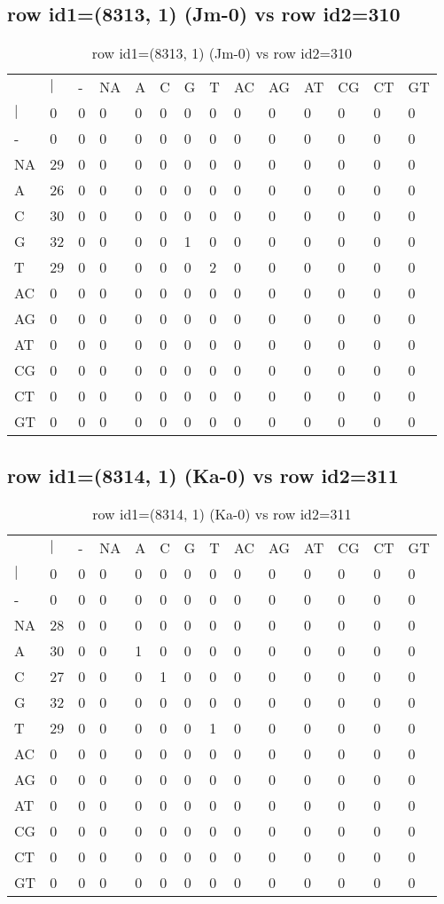 \subsection{row id1=(8313, 1) (Jm-0) vs row id2=310}
\begin{center}
\begin{longtable}{|l|l|l|l|l|l|l|l|l|l|l|l|l|l|}
\caption{row id1=(8313, 1) (Jm-0) vs row id2=310} \label{table_dm500}\\
\hline
\\
\hline
&$|$&-&NA&A&C&G&T&AC&AG&AT&CG&CT&GT\\
$|$&0&0&0&0&0&0&0&0&0&0&0&0&0\\
-&0&0&0&0&0&0&0&0&0&0&0&0&0\\
NA&29&0&0&0&0&0&0&0&0&0&0&0&0\\
A&26&0&0&0&0&0&0&0&0&0&0&0&0\\
C&30&0&0&0&0&0&0&0&0&0&0&0&0\\
G&32&0&0&0&0&1&0&0&0&0&0&0&0\\
T&29&0&0&0&0&0&2&0&0&0&0&0&0\\
AC&0&0&0&0&0&0&0&0&0&0&0&0&0\\
AG&0&0&0&0&0&0&0&0&0&0&0&0&0\\
AT&0&0&0&0&0&0&0&0&0&0&0&0&0\\
CG&0&0&0&0&0&0&0&0&0&0&0&0&0\\
CT&0&0&0&0&0&0&0&0&0&0&0&0&0\\
GT&0&0&0&0&0&0&0&0&0&0&0&0&0\\
\hline
\end{longtable}
\end{center}

\subsection{row id1=(8314, 1) (Ka-0) vs row id2=311}
\begin{center}
\begin{longtable}{|l|l|l|l|l|l|l|l|l|l|l|l|l|l|}
\caption{row id1=(8314, 1) (Ka-0) vs row id2=311} \label{table_dm502}\\
\hline
\\
\hline
&$|$&-&NA&A&C&G&T&AC&AG&AT&CG&CT&GT\\
$|$&0&0&0&0&0&0&0&0&0&0&0&0&0\\
-&0&0&0&0&0&0&0&0&0&0&0&0&0\\
NA&28&0&0&0&0&0&0&0&0&0&0&0&0\\
A&30&0&0&1&0&0&0&0&0&0&0&0&0\\
C&27&0&0&0&1&0&0&0&0&0&0&0&0\\
G&32&0&0&0&0&0&0&0&0&0&0&0&0\\
T&29&0&0&0&0&0&1&0&0&0&0&0&0\\
AC&0&0&0&0&0&0&0&0&0&0&0&0&0\\
AG&0&0&0&0&0&0&0&0&0&0&0&0&0\\
AT&0&0&0&0&0&0&0&0&0&0&0&0&0\\
CG&0&0&0&0&0&0&0&0&0&0&0&0&0\\
CT&0&0&0&0&0&0&0&0&0&0&0&0&0\\
GT&0&0&0&0&0&0&0&0&0&0&0&0&0\\
\hline
\end{longtable}
\end{center}

